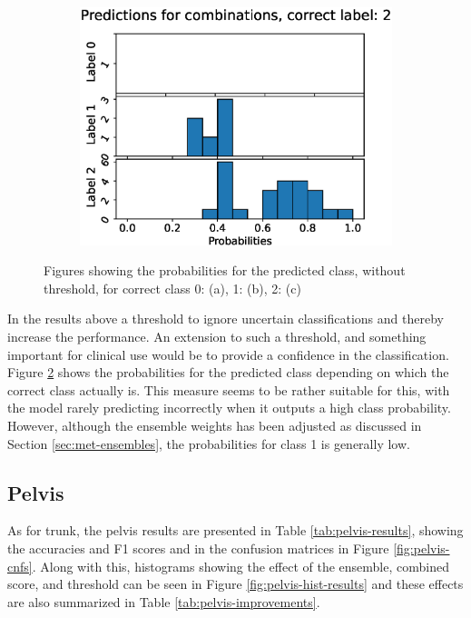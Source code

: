 \begin{figure}
\begin{subfigure}[t]{0.33\textwidth}
    \includegraphics[width=\textwidth]{files/figs/res/trunk/pc2.eps}
    \caption{}
    \label{fig:trunk-pc2}
  \end{subfigure}

  \caption{Figures showing the probabilities for the predicted class, without threshold, for correct class 0: (a), 1: (b), 2: (c)}
  \label{fig:trunk-pc}
\end{figure}

In the results above a threshold to ignore uncertain classifications and thereby increase the performance. An extension to such a threshold, and something important for clinical use would be to provide a confidence in the classification. Figure \ref{fig:trunk-pc} shows the probabilities for the predicted class depending on which the correct class actually is. This measure seems to be rather suitable for this, with the model rarely predicting incorrectly when it outputs a high class probability. However, although the ensemble weights has been adjusted as discussed in Section \ref{sec:met-ensembles}, the probabilities for class 1 is generally low.

\FloatBarrier
\subsection{Pelvis}
As for trunk, the pelvis results are presented in Table \ref{tab:pelvis-results}, showing the accuracies and F1 scores and in the confusion matrices in Figure \ref{fig:pelvis-cnfs}. Along with this, histograms showing the effect of the ensemble, combined score, and threshold can be seen in Figure \ref{fig:pelvis-hist-results} and these effects are also summarized in Table \ref{tab:pelvis-improvements}.

